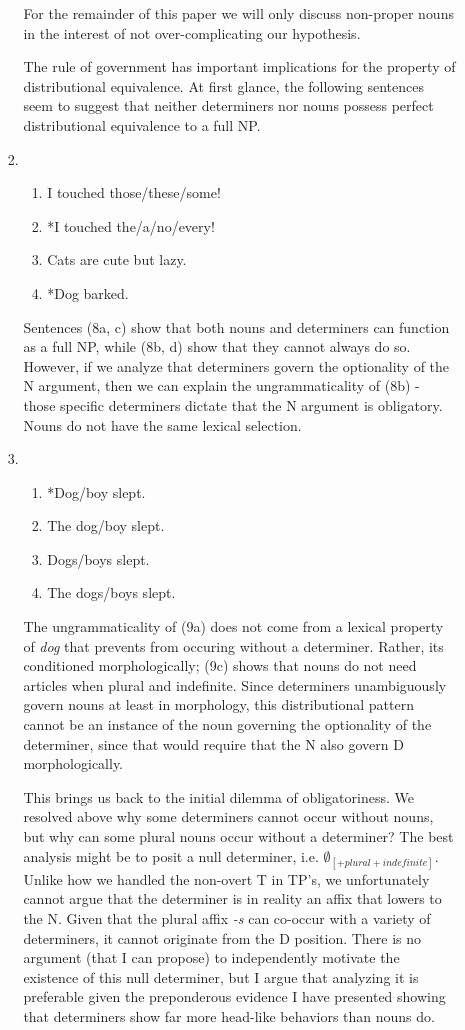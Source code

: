 \documentclass[12pt]{article}
\begin{document}
\begin{enumerate}
\begin{enumerate}
\begin{enumerate}[label=(\arabic*)]
For the remainder of this paper we will only discuss non-proper nouns in the interest of not over-complicating our hypothesis.

The rule of government has important implications for the property of distributional equivalence. At first glance, the following sentences seem to suggest that neither determiners nor nouns possess perfect distributional equivalence to a full NP.
\item
\begin{enumerate}[label=\alph*.]
\item I touched those/these/some!
\item *I touched the/a/no/every!
\item Cats are cute but lazy.
\item *Dog barked.
\end{enumerate}

Sentences (8a, c) show that both nouns and determiners can function as a full NP, while (8b, d) show that they cannot always do so. However, if we analyze that determiners govern the optionality of the N argument, then we can explain the ungrammaticality of (8b) - those specific determiners dictate that the N argument is obligatory. Nouns do not have the same lexical selection.

\item
\begin{enumerate}[label=\alph*.]
\item *Dog/boy slept.
\item The dog/boy slept.
\item Dogs/boys slept.
\item The dogs/boys slept.
\end{enumerate}

The ungrammaticality of (9a) does not come from a lexical property of \emph{dog} that prevents from occuring without a determiner. Rather, its conditioned morphologically; (9c) shows that nouns do not need articles when plural and indefinite. Since determiners unambiguously govern nouns at least in morphology, this distributional pattern cannot be an instance of the noun governing the optionality of the determiner, since that would require that the N also govern D morphologically.

This brings us back to the initial dilemma of obligatoriness. We resolved above why some determiners cannot occur without nouns, but why can some plural nouns occur without a determiner? The best analysis might be to posit a null determiner, i.e. $\emptyset_{[+plural +indefinite]}$. Unlike how we handled the non-overt T in TP's, we unfortunately cannot argue that the determiner is in reality an affix that lowers to the N. Given that the plural affix \emph{-s} can co-occur with a variety of determiners, it cannot originate from the D position. There is no argument (that I can propose) to independently motivate the existence of this null determiner, but I argue that analyzing it is preferable given the preponderous evidence I have presented showing that determiners show far more head-like behaviors than nouns do.


\end{enumerate}
\end{enumerate}
\end{enumerate}
\end{document}
